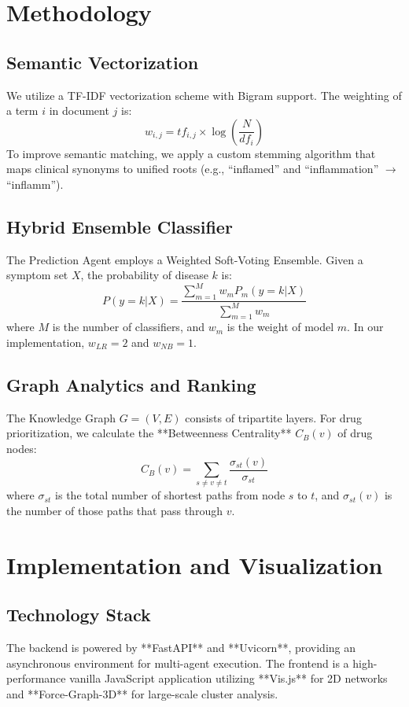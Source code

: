 \documentclass[conference]{IEEEtran}
\begin{document}
\section{Methodology}
\subsection{Semantic Vectorization}
We utilize a TF-IDF vectorization scheme with Bigram support. The weighting of a term $i$ in document $j$ is:
\begin{equation}
w_{i,j} = tf_{i,j} \times \log\left(\frac{N}{df_i}\right)
\end{equation}
To improve semantic matching, we apply a custom stemming algorithm that maps clinical synonyms to unified roots (e.g., ``inflamed'' and ``inflammation'' $\rightarrow$ ``inflamm'').

\subsection{Hybrid Ensemble Classifier}
The Prediction Agent employs a Weighted Soft-Voting Ensemble. Given a symptom set $X$, the probability of disease $k$ is:
\begin{equation}
P(y=k | X) = \frac{\sum_{m=1}^{M} w_m P_m(y=k | X)}{\sum_{m=1}^{M} w_m}
\label{eq:softvoting}
\end{equation}
where $M$ is the number of classifiers, and $w_m$ is the weight of model $m$. In our implementation, $w_{LR}=2$ and $w_{NB}=1$.

\subsection{Graph Analytics and Ranking}
The Knowledge Graph $G=(V, E)$ consists of tripartite layers. For drug prioritization, we calculate the **Betweenness Centrality** $C_B(v)$ of drug nodes:
\begin{equation}
C_B(v) = \sum_{s \neq v \neq t} \frac{\sigma_{st}(v)}{\sigma_{st}}
\end{equation}
where $\sigma_{st}$ is the total number of shortest paths from node $s$ to $t$, and $\sigma_{st}(v)$ is the number of those paths that pass through $v$.

\section{Implementation and Visualization}
\subsection{Technology Stack}
The backend is powered by **FastAPI** and **Uvicorn**, providing an asynchronous environment for multi-agent execution. The frontend is a high-performance vanilla JavaScript application utilizing **Vis.js** for 2D networks and **Force-Graph-3D** for large-scale cluster analysis.
\end{document}
